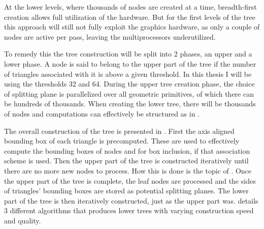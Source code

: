 
At the lower levels, where thousands of nodes are created at a time,
breadth-first creation allows full utilization of the hardware. But for the
first levels of the tree this approach will still not fully exploit the graphics
hardware, as only a couple of nodes are active per pass, leaving the
multiprocessors underutilized.

To remedy this the tree construction will be split into 2 phases, an upper and a
lower phase. A node is said to belong to the upper part of the tree if the
number of triangles associated with it is above a given threshold. In this
thesis I will be using the thresholds 32 and 64. During the upper tree creation
phase, the choice of splitting plane is parallelized over all geometric
primitives, of which there can be hundreds of thousands. When creating the lower
tree, there will be thousands of nodes and computations can effectively be
structured as in .


The overall construction of the tree is presented in
. First the axis aligned bounding box of
each triangle is precomputed. These are used to effectively compute
the bounding boxes of nodes and for box inclusion, if that association
scheme is used. Then the upper part of the tree is constructed
iteratively until there are no more new nodes to process. How this is
done is the topic of . Once the upper part
of the tree is complete, the leaf nodes are processed and the sides of
triangles' bounding boxes are stored as potential splitting
planes. The lower part of the tree is then iteratively constructed,
just as the upper part was.  details 3
different algorithms that produces lower trees with varying
construction speed and quality.

